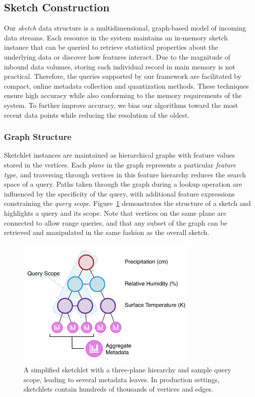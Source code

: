 \subsection{Sketch Construction}
\label{sec:sketch}
Our \emph{sketch} data structure is a multidimensional, graph-based model of incoming data streams. Each resource in the system maintains an in-memory sketch instance that can be queried to retrieve statistical properties about the underlying data or discover how features interact. Due to the magnitude of inbound data volumes, storing each individual record in main memory is not practical. Therefore, the queries supported by our framework are facilitated by compact, online metadata collection and quantization methods. These techniques ensure high accuracy while also conforming to the memory requirements of the system. To further improve accuracy, we bias our algorithms toward the most recent data points while reducing the resolution of the oldest.

\subsubsection{Graph Structure}
Sketchlet instances are maintained as hierarchical graphs with feature values stored in the vertices. Each \emph{plane} in the graph represents a particular \emph{feature type}, and traversing through vertices in this feature hierarchy reduces the search space of a query. Paths taken through the graph during a lookup operation are influenced by the specificity of the query, with additional feature expressions constraining the \emph{query scope}. Figure~\ref{fig:sketch} demonstrates the structure of a sketch and highlights a query and its scope. Note that vertices on the same plane are connected to allow range queries, and that any subset of the graph can be retrieved and manipulated in the same fashion as the overall sketch.

\begin{figure}
    \centerline{\includegraphics[width=3.5in]{figures/sketch.pdf}}
    \caption{A simplified sketchlet with a three-plane hierarchy and sample query scope, leading to several metadata leaves. In production settings, sketchlets contain hundreds of thousands of vertices and edges.}
    \label{fig:sketch}
\end{figure}

